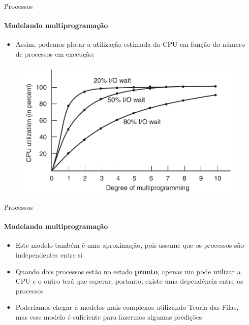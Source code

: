 \documentclass{beamer}
\begin{document}
\begin{frame}{Processos}
	\framesubtitle{Modelando multiprogramação}
	\begin{itemize}
		\item Assim, podemos plotar a utilização estimada da CPU em função do número de processos em execução:
	\end{itemize}
	\begin{figure}
		\includegraphics[width=0.7\paperwidth]{resources/multiprog}
	\end{figure}
 \end{frame}
 \begin{frame}{Processos}
 	\framesubtitle{Modelando multiprogramação}
 	\begin{itemize}
 		\item Este modelo também é uma aproximação, pois assume que os processos são independentes entre sí
 		\item Quando dois processos estão no estado \textbf{pronto}, apenas um pode utilizar a CPU e o outro terá que esperar, portanto, existe uma dependência entre os processos
 		\item Poderíamos chegar a modelos mais complexos utilizando Teoria das Filas, mas esse modelo é suficiente para fazermos algumas predições
 	\end{itemize}
 \end{frame}
\end{document}
